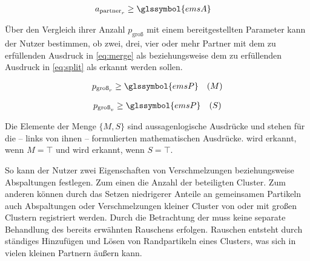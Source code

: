 \begin{equation}
	\begin{aligned}\label{eq:bigPartner:merge}
		a_{\text{partner}_r} &\ge \glssymbol{emsA}
	\end{aligned}
\end{equation}

Über den Vergleich ihrer Anzahl $p_\text{groß}$ mit einem bereitgestellten Parameter  kann der Nutzer bestimmen, ob zwei, drei, vier oder mehr Partner mit dem zu erfüllenden Ausdruck in \autoref{eq:merge} als  beziehungsweise dem zu erfüllenden Ausdruck in \autoref{eq:split} als  erkannt werden sollen.

\begin{equation}
\begin{aligned}\label{eq:merge}
p_{\text{groß}_r} &\ge \glssymbol{emsP} &(M)
\end{aligned}
\end{equation}

\begin{equation}
\begin{aligned}\label{eq:split}
p_{\text{groß}_v} &\ge \glssymbol{emsP} &(S)
\end{aligned}
\end{equation}

Die Elemente der Menge $\{M,S\}$ sind aussagenlogische Ausdrücke und stehen für die -- links von ihnen -- formulierten mathematischen Ausdrücke.  wird erkannt, wenn $M = \top$ und  wird erkannt, wenn $S = \top$.

So kann der Nutzer zwei Eigenschaften von Verschmelzungen beziehungsweise Abspaltungen festlegen. Zum einen die Anzahl der beteiligten Cluster. Zum anderen können durch das Setzen niedrigerer Anteile an gemeinsamen Partikeln auch Abspaltungen oder Verschmelzungen kleiner Cluster von oder mit großen Clustern registriert werden. Durch die Betrachtung der  muss keine separate Behandlung des bereits erwähnten Rauschens erfolgen. Rauschen entsteht durch ständiges Hinzufügen und Lösen von Randpartikeln eines Clusters, was sich in vielen kleinen Partnern äußern kann.


